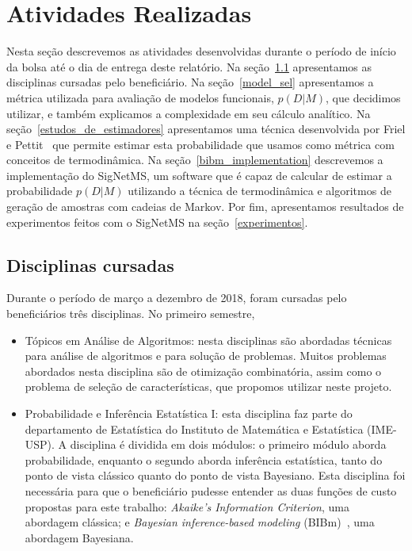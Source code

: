 \documentclass[12pt]{article}
\begin{document}
\section{Atividades Realizadas}
Nesta seção descrevemos as atividades desenvolvidas durante o período
de início da bolsa até o dia de entrega deste relatório. Na 
seção~\ref{disciplinas} apresentamos as disciplinas cursadas pelo 
beneficiário. Na seção~\ref{model_sel} apresentamos a métrica utilizada
para avaliação de modelos funcionais, $p (D | M)$, que decidimos 
utilizar, e também explicamos a complexidade em seu cálculo analítico. 
Na seção~\ref{estudos_de_estimadores} apresentamos uma técnica 
desenvolvida por Friel e Pettit~\cite{Friel2008} que permite estimar 
esta probabilidade que usamos como métrica com  conceitos de 
termodinâmica. Na seção~\ref{bibm_implementation} descrevemos a 
implementação do SigNetMS, um software que é capaz de calcular de 
estimar a probabilidade $p (D | M)$ utilizando a técnica de 
termodinâmica e algoritmos de geração de amostras com cadeias de Markov.
Por fim, apresentamos resultados de experimentos feitos com o SigNetMS
na seção~\ref{experimentos}.

\subsection{Disciplinas cursadas}\label{disciplinas}

Durante o período de março a dezembro de 2018, foram cursadas pelo
beneficiários três disciplinas. No primeiro semestre, 
\begin{itemize}
    \item{Tópicos em Análise de Algoritmos:} nesta disciplinas são
        abordadas técnicas para análise de algoritmos e para solução
        de problemas. Muitos problemas abordados nesta disciplina são
        de otimização combinatória, assim como o problema de seleção de 
        características, que propomos utilizar neste projeto.
    \item{Probabilidade e Inferência Estatística I:} esta disciplina
        faz parte do departamento de Estatística do Instituto de 
        Matemática e Estatística (IME-USP). A disciplina é dividida em
        dois módulos: o primeiro módulo aborda probabilidade, enquanto
        o segundo aborda inferência estatística, tanto do ponto de vista
        clássico quanto do ponto de vista Bayesiano. Esta disciplina
        foi necessária para que o beneficiário pudesse entender as 
        duas funções de custo propostas para este trabalho: {\em 
        Akaike's Information Criterion}, uma abordagem clássica; e 
        {\em Bayesian inference-based modeling} (BIBm)~\cite{Xu2010}, 
        uma abordagem Bayesiana.
\end{itemize}
\end{document}
